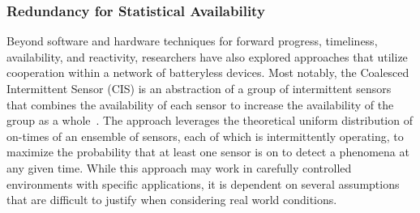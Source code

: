 


\subsubsection{Redundancy for Statistical Availability}
Beyond software and hardware techniques for forward progress, timeliness, availability, and reactivity, researchers have also explored approaches that utilize cooperation within a network of batteryless devices. 
Most notably, the Coalesced Intermittent Sensor (CIS) is an abstraction of a group of intermittent sensors that combines the availability of each sensor to increase the availability of the group as a whole~\cite{majid2020continuous}. 
The approach leverages the theoretical uniform distribution of on-times of an ensemble of sensors, each of which is intermittently operating, to maximize the probability that at least one sensor is on to detect a phenomena at any given time. 
While this approach may work in carefully controlled environments with specific applications, it is dependent on several assumptions that are difficult to justify when considering real world conditions. 

